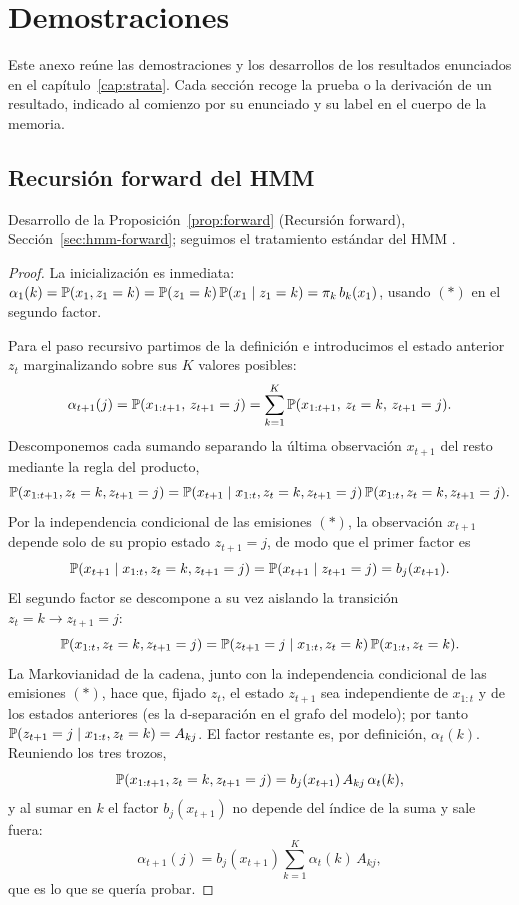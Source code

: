 \chapter{Demostraciones}
\label{anx:demostraciones}

Este anexo reúne las demostraciones y los desarrollos de los resultados enunciados en el capítulo~\ref{cap:strata}. Cada sección recoge la prueba o la derivación de un resultado, indicado al comienzo por su enunciado y su label en el cuerpo de la memoria.

\section{Recursión forward del HMM}
\label{anx:forward}

Desarrollo de la Proposición~\ref{prop:forward} (Recursión forward), Sección~\ref{sec:hmm-forward}; seguimos el tratamiento estándar del HMM \cite{rabiner1989, bishop2006}.

\begin{proof}
La inicialización es inmediata: $\alpha_1(k) = \mathbb{P}(x_1, z_1 = k) = \mathbb{P}(z_1 = k)\,\mathbb{P}(x_1 \mid z_1 = k) = \pi_k\, b_k(x_1)$, usando $(\ast)$ en el segundo factor.

Para el paso recursivo partimos de la definición e introducimos el estado anterior $z_t$ marginalizando sobre sus $K$ valores posibles:
\[
\alpha_{t+1}(j)
= \mathbb{P}(x_{1:t+1},\, z_{t+1} = j)
= \sum_{k=1}^{K} \mathbb{P}(x_{1:t+1},\, z_t = k,\, z_{t+1} = j).
\]
Descomponemos cada sumando separando la última observación $x_{t+1}$ del resto mediante la regla del producto,
\[
\mathbb{P}(x_{1:t+1}, z_t = k, z_{t+1} = j)
= \mathbb{P}(x_{t+1} \mid x_{1:t}, z_t = k, z_{t+1} = j)\,
  \mathbb{P}(x_{1:t}, z_t = k, z_{t+1} = j).
\]
Por la independencia condicional de las emisiones $(\ast)$, la observación $x_{t+1}$ depende solo de su propio estado $z_{t+1} = j$, de modo que el primer factor es
\[
\mathbb{P}(x_{t+1} \mid x_{1:t}, z_t = k, z_{t+1} = j) = \mathbb{P}(x_{t+1} \mid z_{t+1} = j) = b_j(x_{t+1}).
\]
El segundo factor se descompone a su vez aislando la transición $z_t = k \to z_{t+1} = j$:
\[
\mathbb{P}(x_{1:t}, z_t = k, z_{t+1} = j)
= \mathbb{P}(z_{t+1} = j \mid x_{1:t}, z_t = k)\, \mathbb{P}(x_{1:t}, z_t = k).
\]
La Markovianidad de la cadena, junto con la independencia condicional de las emisiones $(\ast)$, hace que, fijado $z_t$, el estado $z_{t+1}$ sea independiente de $x_{1:t}$ y de los estados anteriores (es la d-separación en el grafo del modelo); por tanto $\mathbb{P}(z_{t+1} = j \mid x_{1:t}, z_t = k) = A_{kj}$. El factor restante es, por definición, $\alpha_t(k)$. Reuniendo los tres trozos,
\[
\mathbb{P}(x_{1:t+1}, z_t = k, z_{t+1} = j) = b_j(x_{t+1})\, A_{kj}\, \alpha_t(k),
\]
y al sumar en $k$ el factor $b_j(x_{t+1})$ no depende del índice de la suma y sale fuera:
\[
\alpha_{t+1}(j) = b_j(x_{t+1}) \sum_{k=1}^{K} \alpha_t(k)\, A_{kj},
\]
que es lo que se quería probar.
\end{proof}

